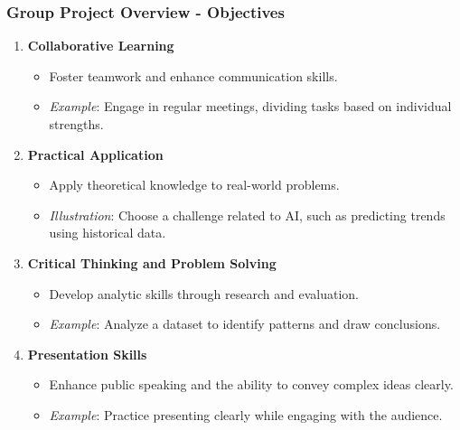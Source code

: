 \documentclass[aspectratio=169]{beamer}
\begin{document}
\begin{frame}[fragile]
    \frametitle{Group Project Overview - Objectives}
    \begin{enumerate}
        \item \textbf{Collaborative Learning}
            \begin{itemize}
                \item Foster teamwork and enhance communication skills.
                \item \textit{Example}: Engage in regular meetings, dividing tasks based on individual strengths.
            \end{itemize}

        \item \textbf{Practical Application}
            \begin{itemize}
                \item Apply theoretical knowledge to real-world problems.
                \item \textit{Illustration}: Choose a challenge related to AI, such as predicting trends using historical data.
            \end{itemize}

        \item \textbf{Critical Thinking and Problem Solving}
            \begin{itemize}
                \item Develop analytic skills through research and evaluation.
                \item \textit{Example}: Analyze a dataset to identify patterns and draw conclusions.
            \end{itemize}

        \item \textbf{Presentation Skills}
            \begin{itemize}
                \item Enhance public speaking and the ability to convey complex ideas clearly.
                \item \textit{Example}: Practice presenting clearly while engaging with the audience.
            \end{itemize}
    \end{enumerate}
\end{frame}
\end{document}
